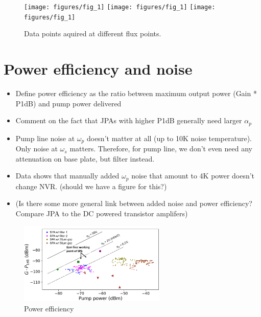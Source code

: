 \documentclass[aip,reprint]{revtex4-2}
\begin{document}
\begin{figure}[htb]
{\label{fig:pump_leakage}
\texttt{[image: figures/fig\_1]}
}
{\label{fig:pump_efficiency}
\texttt{[image: figures/fig\_1]}
}
{\label{fig:noise_temperature}
\texttt{[image: figures/fig\_1]}
}
\caption
{\label{fig:device} Data points aquired at different flux points. }
\end{figure}




\section{Power efficiency and noise}

\begin{itemize}
	\item Define power efficiency as the ratio between maximum output power (Gain * P1dB) and pump power delivered
	\item Comment on the fact that JPAs with higher P1dB generally need larger $\alpha_p$
	\item Pump line noise at $\omega_p$ doesn't matter at all (up to 10K noise temperature). Only noise at $\omega_s$ matters. Therefore, for pump line, we don't even need any attenuation on base plate, but filter instead. 
	\item Data shows that manually added $\omega_p$ noise that amount to 4K power doesn't change NVR. (should we have a figure for this?)
	\item (Is there some more general link between added noise and power efficiency? Compare JPA to the DC powered transistor amplifers)
\end{itemize}

\begin{figure}[htb]
\includegraphics[width=7cm]{figures/power_efficiency.PNG}
\caption
{\label{fig:power_efficiency}Power efficiency}
\end{figure}
\end{document}
